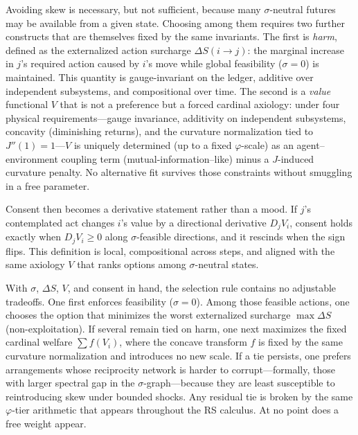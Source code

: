 \documentclass[11pt]{article}
\begin{document}
Avoiding skew is necessary, but not sufficient, because many \(\sigma\)-neutral futures may be available from a given state. Choosing among them requires two further constructs that are themselves fixed by the same invariants. The first is \emph{harm}, defined as the externalized action surcharge \(\Delta S(i\!\to\!j)\): the marginal increase in \(j\)’s required action caused by \(i\)’s move while global feasibility (\(\sigma=0\)) is maintained. This quantity is gauge-invariant on the ledger, additive over independent subsystems, and compositional over time. The second is a \emph{value} functional \(V\) that is not a preference but a forced cardinal axiology: under four physical requirements—gauge invariance, additivity on independent subsystems, concavity (diminishing returns), and the curvature normalization tied to \(J''(1)=1\)—\(V\) is uniquely determined (up to a fixed \(\varphi\)-scale) as an agent–environment coupling term (mutual-information–like) minus a \(J\)-induced curvature penalty. No alternative fit survives those constraints without smuggling in a free parameter.

Consent then becomes a derivative statement rather than a mood. If \(j\)’s contemplated act changes \(i\)’s value by a directional derivative \(D_j V_i\), consent holds exactly when \(D_j V_i\ge 0\) along \(\sigma\)-feasible directions, and it rescinds when the sign flips. This definition is local, compositional across steps, and aligned with the same axiology \(V\) that ranks options among \(\sigma\)-neutral states.

With \(\sigma\), \(\Delta S\), \(V\), and consent in hand, the selection rule contains no adjustable tradeoffs. One first enforces feasibility (\(\sigma=0\)). Among those feasible actions, one chooses the option that minimizes the worst externalized surcharge \(\max\Delta S\) (non-exploitation). If several remain tied on harm, one next maximizes the fixed cardinal welfare \(\sum f(V_i)\), where the concave transform \(f\) is fixed by the same curvature normalization and introduces no new scale. If a tie persists, one prefers arrangements whose reciprocity network is harder to corrupt—formally, those with larger spectral gap in the \(\sigma\)-graph—because they are least susceptible to reintroducing skew under bounded shocks. Any residual tie is broken by the same \(\varphi\)-tier arithmetic that appears throughout the RS calculus. At no point does a free weight appear.
\end{document}

